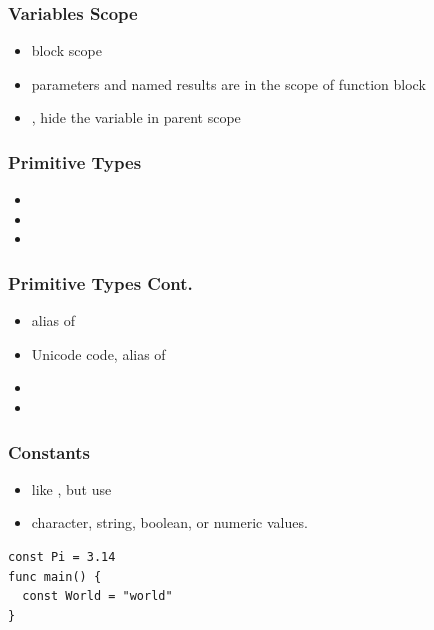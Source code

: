 \documentclass[xetex,mathserif,serif,12pt]{beamer}
\begin{document}
\begin{frame}
  \frametitle{Variables Scope}

  \begin{itemize}
  \item block scope
  \item parameters and named results are in the scope of function block
  \item {}, \hltexttt{:=} hide the variable in parent scope
  \end{itemize}
\end{frame}

\begin{frame}

  \frametitle{Primitive Types}

  \begin{itemize}
  \item {}
  \item {}
  \item
            \newline
        \newline
  \end{itemize}

\end{frame}

\begin{frame}

  \frametitle{Primitive Types Cont.}

  \begin{itemize}
  \item {} alias of 
  \item {} Unicode code, alias of 
  \item {} 
  \item {} 
  \end{itemize}
\end{frame}

\begin{frame}[fragile]
  \frametitle{Constants}

  \begin{itemize}
  \item like , but use 
  \item character, string, boolean, or numeric values.
  \end{itemize}

  \begin{beamer@nomargin}
    \begin{lstlisting}
const Pi = 3.14
func main() {
  const World = "world"
}
    \end{lstlisting}
  \end{beamer@nomargin}
\end{frame}
\end{document}
